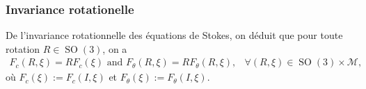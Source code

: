 \documentclass[12pt,a4paper]{article}
\theoremstyle{plain}
\theoremstyle{plain}
\theoremstyle{plain}
\theoremstyle{definition}
\theoremstyle{definition}
\theoremstyle{definition}
\theoremstyle{plain}
\newcommand{\M}{\mathcal{M}}
\DeclareMathOperator{\SO}{SO}
\begin{document}
\subsubsection{Invariance rotationelle}
%
%
%
%

De l'invariance rotationnelle des équations de Stokes, on déduit que pour toute rotation $R \in \SO(3)$, on a
\begin{eqnarray}
	F_c(R, \xi) = R F_c(\xi) \text { and } F_\theta(R, \xi) = R F_{\theta} (R, \xi),&  \forall (R, \xi) \in \SO(3) \times \M,
\end{eqnarray}
où $F_c(\xi) := F_{c}(I, \xi)$ et $F_{\theta}(\xi) := F_{\theta}(I, \xi)$.
\end{document}
